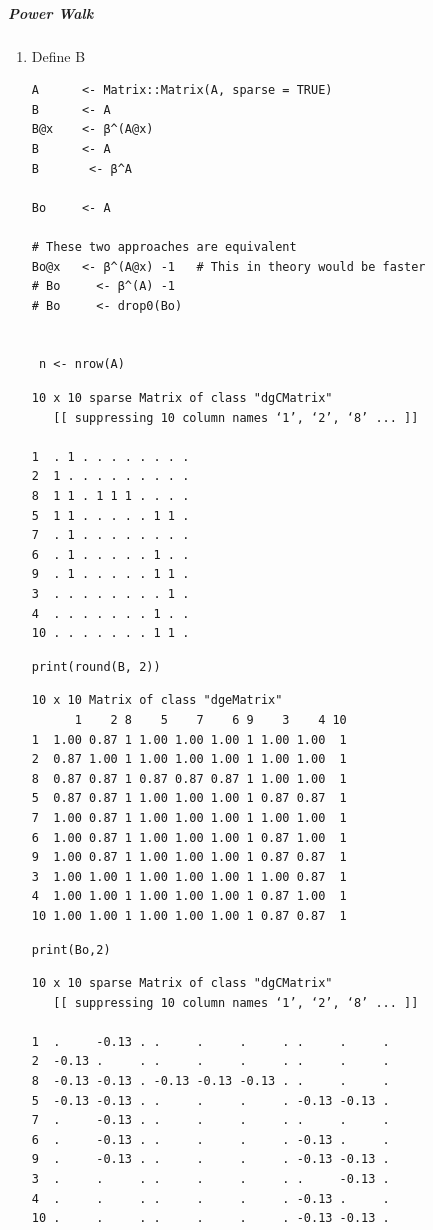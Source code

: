\documentclass[11pt]{article}
\begin{document}
\subparagraph{Power Walk}
\label{sec:org8778cbe}
\begin{enumerate}
\item Define B
\label{sec:orge62c654}
\begin{verbatim}
A      <- Matrix::Matrix(A, sparse = TRUE)
B      <- A
B@x    <- β^(A@x)
B      <- A
B       <- β^A

Bo     <- A

# These two approaches are equivalent
Bo@x   <- β^(A@x) -1   # This in theory would be faster
# Bo     <- β^(A) -1
# Bo     <- drop0(Bo)


 n <- nrow(A)
\end{verbatim}

\begin{verbatim}
10 x 10 sparse Matrix of class "dgCMatrix"
   [[ suppressing 10 column names ‘1’, ‘2’, ‘8’ ... ]]

1  . 1 . . . . . . . .
2  1 . . . . . . . . .
8  1 1 . 1 1 1 . . . .
5  1 1 . . . . . 1 1 .
7  . 1 . . . . . . . .
6  . 1 . . . . . 1 . .
9  . 1 . . . . . 1 1 .
3  . . . . . . . . 1 .
4  . . . . . . . 1 . .
10 . . . . . . . 1 1 .
\end{verbatim}

\begin{verbatim}
print(round(B, 2))
\end{verbatim}

\begin{verbatim}
10 x 10 Matrix of class "dgeMatrix"
      1    2 8    5    7    6 9    3    4 10
1  1.00 0.87 1 1.00 1.00 1.00 1 1.00 1.00  1
2  0.87 1.00 1 1.00 1.00 1.00 1 1.00 1.00  1
8  0.87 0.87 1 0.87 0.87 0.87 1 1.00 1.00  1
5  0.87 0.87 1 1.00 1.00 1.00 1 0.87 0.87  1
7  1.00 0.87 1 1.00 1.00 1.00 1 1.00 1.00  1
6  1.00 0.87 1 1.00 1.00 1.00 1 0.87 1.00  1
9  1.00 0.87 1 1.00 1.00 1.00 1 0.87 0.87  1
3  1.00 1.00 1 1.00 1.00 1.00 1 1.00 0.87  1
4  1.00 1.00 1 1.00 1.00 1.00 1 0.87 1.00  1
10 1.00 1.00 1 1.00 1.00 1.00 1 0.87 0.87  1
\end{verbatim}


\begin{verbatim}
print(Bo,2)
\end{verbatim}

\begin{verbatim}
10 x 10 sparse Matrix of class "dgCMatrix"
   [[ suppressing 10 column names ‘1’, ‘2’, ‘8’ ... ]]

1  .     -0.13 . .     .     .     . .     .     .
2  -0.13 .     . .     .     .     . .     .     .
8  -0.13 -0.13 . -0.13 -0.13 -0.13 . .     .     .
5  -0.13 -0.13 . .     .     .     . -0.13 -0.13 .
7  .     -0.13 . .     .     .     . .     .     .
6  .     -0.13 . .     .     .     . -0.13 .     .
9  .     -0.13 . .     .     .     . -0.13 -0.13 .
3  .     .     . .     .     .     . .     -0.13 .
4  .     .     . .     .     .     . -0.13 .     .
10 .     .     . .     .     .     . -0.13 -0.13 .
\end{verbatim}


\end{enumerate}
\end{document}
